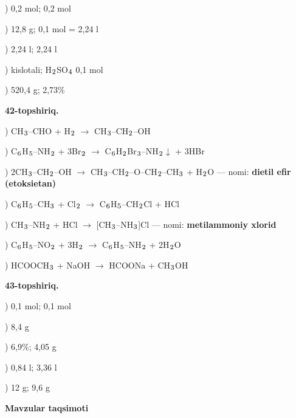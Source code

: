 \documentclass[11pt,a4paper]{article}
\renewcommand{\textsubscript}[1]{\ensuremath{_{\text{\fontsize{8}{8}\selectfont #1}}}}
\begin{document}
) 0,2 mol; 0,2 mol\par
{}) 12,8 g; 0,1 mol = 2,24 l\par
{}) 2,24 l; 2,24 l\par
{}) kislotali; H\textsubscript{2}SO\textsubscript{4} 0,1 mol\par
{}) 520,4 g; 2,73\%\par
\noindent\textbf{42-topshiriq.}\par
{}) CH\textsubscript{3}--CHO + H\textsubscript{2} $\to$ CH\textsubscript{3}--CH\textsubscript{2}--OH\par
{}) C\textsubscript{6}H\textsubscript{5}--NH\textsubscript{2} + 3Br\textsubscript{2} $\to$ C\textsubscript{6}H\textsubscript{2}Br\textsubscript{3}--NH\textsubscript{2}$\downarrow$ + 3HBr\par
{}) 2CH\textsubscript{3}--CH\textsubscript{2}--OH $\to$ CH\textsubscript{3}--CH\textsubscript{2}--O--CH\textsubscript{2}--CH\textsubscript{3} + H\textsubscript{2}O --- nomi: \textbf{dietil efir (etoksietan)}\par
{}) C\textsubscript{6}H\textsubscript{5}--CH\textsubscript{3} + Cl\textsubscript{2} $\to$ C\textsubscript{6}H\textsubscript{5}--CH\textsubscript{2}Cl + HCl\par
{}) CH\textsubscript{3}--NH\textsubscript{2} + HCl $\to$ [CH\textsubscript{3}--NH\textsubscript{3}]Cl --- nomi: \textbf{metilammoniy xlorid}\par
{}) C\textsubscript{6}H\textsubscript{5}--NO\textsubscript{2} + 3H\textsubscript{2} $\to$ C\textsubscript{6}H\textsubscript{5}--NH\textsubscript{2} + 2H\textsubscript{2}O\par
{}) HCOOCH\textsubscript{3} + NaOH $\to$ HCOONa + CH\textsubscript{3}OH\par
\noindent\textbf{43-topshiriq.}\par
{}) 0,1 mol; 0,1 mol\par
{}) 8,4 g\par
{}) 6,9\%; 4,05 g\par
{}) 0,84 l; 3,36 l\par
{}) 12 g; 9,6 g\par
\par\bigskip\noindent\textbf{Mavzular taqsimoti}\par\smallskip
\end{document}
